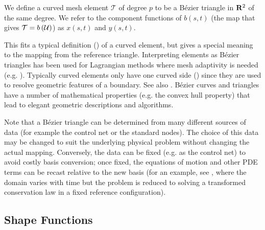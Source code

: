 We define a curved mesh element \(\mathcal{T}\) of degree \(p\)
to be a B\'{e}zier triangle in \(\mathbf{R}^2\) of the same degree.
We refer to the component functions of \(b(s, t)\) (the map that
gives \(\mathcal{T} = b\left(\mathcal{U}\right)\)) as \(x(s, t)\) and \(y(s, t)\).

This fits a typical definition (\cite[Chapter~12]{FEM-ClaesJohnson})
of a curved element, but gives a special meaning to the mapping from
the reference triangle. Interpreting elements as B\'{e}zier triangles
has been used for Lagrangian methods where
mesh adaptivity is needed (e.g. \cite{CardozeMOP04}). Typically curved
elements only have one curved side (\cite{McLeod1972}) since they are used
to resolve geometric features of a boundary. See also
\cite{Zlmal1973, Zlmal1974}.
B\'{e}zier curves and triangles have a number of mathematical properties
(e.g. the convex hull property) that lead to elegant geometric
descriptions and algorithms.

Note that a B\'{e}zier triangle can be
determined from many different sources of data (for example the control net
or the standard nodes). The choice of this data may be changed to suit the
underlying physical problem without changing the actual mapping. Conversely,
the data can be fixed (e.g. as the control net) to avoid costly basis
conversion; once fixed, the equations of motion and other PDE terms can
be recast relative to the new basis (for an example, see \cite{Persson2009},
where the domain varies with time but the problem is reduced to
solving a transformed conservation law in a fixed reference configuration).

\subsection{Shape Functions}\label{subsec:shape-functions}


